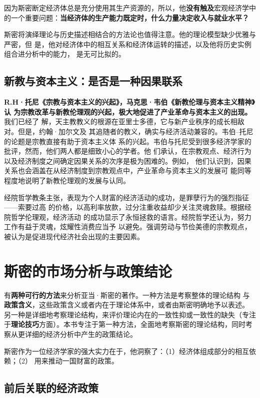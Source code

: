 因为斯密断定经济体总是充分使用其生产资源的，所以，他\textbf{没有触及}宏观经济学中
的一个重要问题：\textbf{当经济体的生产能力既定时，什么力量决定收入与就业水平？}

斯密将演绎理论与历史描述相结合的方法论也值得注意。他的理论模型缺少优雅与严密，但
是，他对经济体中的相互关系和经济体运转的描述，以及他将历史实例组合进分析中的能力，
是无可比拟的。

\subsection{新教与资本主义：是否是一种因果联系}

\textbf{R.H·托尼《宗教与资本主义的兴起》，马克思·韦伯《新教伦理与资本主义精神》认
  为宗教改革与新教伦理观的兴起，极大地促进了产业革命与资本主义的出现。}我们已经了
解，天主教教义的根源在亚里士多德，它与新产业秩序的成长相敌对。但是，约翰·加尔文及
其追随者的教义，确实与经济活动兼容的。韦伯--托尼的论题是宗教直接有助于资本主义体
系的兴起。韦伯与托尼受到很多经济学家的批评，然而，他们两人都是细致小心的学者。他
们承认，在宗教观点、经济行为以及经济制度之间确定因果关系的次序是极为困难的。例如，
他们认识到，因果关系也会涵盖在从经济制度到宗教观点中，产业革命与资本主义的发展可
能同等程度地说明了新教伦理观的发展与认同。

经院哲学教条主张，表现为个人财富的经济活动的成功，是罪孽行为的强烈指征——索要过高
的价格，以高利率放款，过分注重收益却少关注灵魂救赎。根据经院哲学伦理观，经济活动
的成功显示了永恒拯救的语言。经院哲学还认为，努力工作有益于灵魂，炫耀性消费应当予
以避免。强调劳动与节俭美德的宗教观点，被认为是促进现代经济社会出现的主要因素。

\section{斯密的市场分析与政策结论}

有\textbf{两种可行的方法}来分析亚当·斯密的著作。一种方法是考察整体的理论结构
与\textbf{政策含义}，这些政策含义或者内在于理论体系中，或者由斯密明确地予以表述。
另一种是详细地考察理论结构，来评价理论内在的一致性抑或一致性的缺失（专注
于\textbf{理论技巧}方面）。本书专注于第一种方法，全面地考察斯密的理论结构，同时考
察从更详细的经济分析中产生的政策结论。

斯密作为一位经济学家的强大实力在于，他洞察了：（1）经济体组成部分的相互依赖；（2）
用来推动一国财富的政策。

\subsection{前后关联的经济政策}

